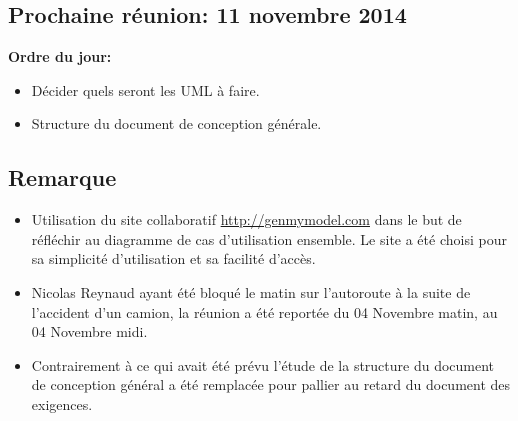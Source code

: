 \documentclass{article}
\begin{document}
\subsection*{Prochaine réunion: 11 novembre 2014}
	\textbf{Ordre du jour:} 
	\begin{itemize}
		\item Décider quels seront les UML à faire.
		\item Structure du document de conception générale.
	\end{itemize}
	
\subsection*{Remarque}
\begin{itemize}
	\item Utilisation du site collaboratif \url{http://genmymodel.com} dans le but de réfléchir au diagramme de cas d'utilisation ensemble. Le site a été choisi pour sa simplicité d'utilisation et sa facilité d'accès.
	\item Nicolas Reynaud ayant été bloqué le matin sur l'autoroute à la suite de l'accident d'un camion, la réunion a été reportée du 04 Novembre matin, au 04 Novembre midi.
	\item Contrairement à ce qui avait été prévu l'étude de la structure du document de conception général a été remplacée pour pallier au retard du document des exigences.
\end{itemize}
\end{document}
